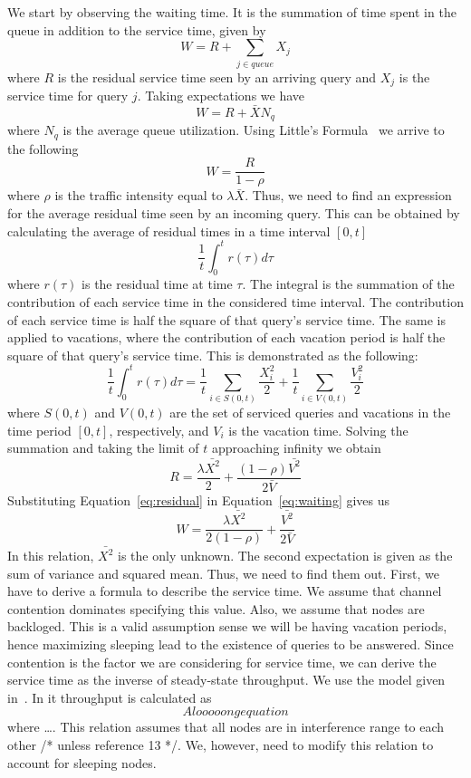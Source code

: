 We start by observing the waiting time. It is the summation of time spent in the queue in addition to the service time, given by
\begin{equation}
W = R + \sum_{j \in queue} X_j
\end{equation}
where $R$ is the residual service time seen by an arriving query and $X_j$ is the service time for query $j$. Taking expectations we have
\begin{equation}
W = R + \bar{X}N_q
\end{equation}
where $N_q$ is the average queue utilization. Using Little's Formula~\cite{Littles} we arrive to the following
\begin{equation}
\label{eq:waiting}
W = \frac{R}{1 - \rho}
\end{equation}
where $\rho$ is the traffic intensity equal to $\lambda\bar{X}$. Thus, we need to find an expression for the average residual time seen by an incoming query. This can be obtained by calculating the average of residual times in a time interval $[0, t]$
\begin{equation}
\frac{1}{t} \int_0^t r(\tau) d\tau
\end{equation}
where $r(\tau)$ is the residual time at time $\tau$. The integral is the summation of the contribution of each service time in the considered time interval. The contribution of each service time is half the square of that query's service time. The same is applied to vacations, where the contribution of each vacation period is half the square of that query's service time. This is demonstrated as the following:
\begin{equation}
\frac{1}{t} \int_0^t r(\tau) d\tau = \frac{1}{t} \sum_{i \in S(0,t)} \frac{X_i^2}{2} + \frac{1}{t} \sum_{i \in V(0,t)} \frac{V_i^2}{2}
\end{equation}
where $S(0,t)$ and $V(0,t)$ are the set of serviced queries and vacations in the time period $[0, t]$, respectively, and $V_i$ is the vacation time. Solving the summation and taking the limit of $t$ approaching infinity we obtain
\begin{equation}
\label{eq:residual}
R = \frac{\lambda\bar{X^2}}{2} + \frac{(1-\rho)\bar{V^2}}{2\bar{V}}
\end{equation}
Substituting Equation~\ref{eq:residual} in Equation~\ref{eq:waiting} gives us
\begin{equation}
\label{eq:waiting_2}
W = \frac{\lambda\bar{X^2}}{2 (1-\rho)} + \frac{\bar{V^2}}{2\bar{V}}
\end{equation}
In this relation, $\bar{X^2}$ is the only unknown. The second expectation is given as the sum of variance and squared mean. Thus, we need to find them out. First, we have to derive a formula to describe the service time. We assume that channel contention dominates specifying this value. Also, we assume that nodes are backloged. This is a valid assumption sense we will be having vacation periods, hence maximizing sleeping lead to the existence of queries to be answered. Since contention is the factor we are considering for service time, we can derive the service time as the inverse of steady-state throughput. We use the model given in~\cite{802.15.4_model}. In it throughput is calculated as
\begin{equation}
\label{eq:throughput}
A looooong equation
\end{equation}
where \ldots. This relation assumes that all nodes are in interference range to each other /* unless reference 13 */. We, however, need to modify this relation to account for sleeping nodes.
